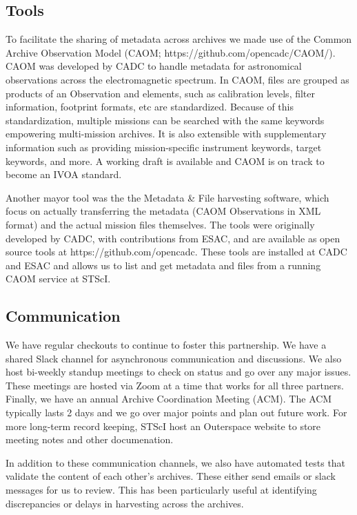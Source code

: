 \documentclass[11pt,twoside]{article}
\begin{document}
\subsection{Tools}

To facilitate the sharing of metadata across archives we made use of the Common Archive Observation Model (CAOM; https://github.com/opencadc/CAOM/). 
CAOM was developed by CADC to handle metadata for astronomical observations across the electromagnetic spectrum. 
In CAOM, files are grouped as products of an Observation and elements, such as calibration levels, filter information, footprint formats, etc are standardized. 
Because of this standardization, multiple missions can be searched with the same keywords empowering multi-mission archives. 
It is also extensible with supplementary information such as providing mission-specific instrument keywords, target keywords, and more. 
A working draft is available and CAOM is on track to become an IVOA standard. 

Another mayor tool was the the Metadata \& File harvesting software, which focus on actually transferring the metadata (CAOM Observations in XML format) and the actual mission files themselves. 
The tools were originally developed by CADC, with contributions from ESAC, and are available as open source tools at https://github.com/opencadc.
These tools are installed at CADC and ESAC and allows us to list and get metadata and files from a running CAOM service at STScI. 

\subsection{Communication}

We have regular checkouts to continue to foster this partnership. 
We have a shared Slack channel for asynchronous communication and discussions. 
We also host bi-weekly standup meetings to check on status and go over any major issues. 
These meetings are hosted via Zoom at a time that works for all three partners. 
Finally, we have an annual Archive Coordination Meeting (ACM). 
The ACM typically lasts 2 days and we go over major points and plan out future work. 
For more long-term record keeping, STScI host an Outerspace website to store meeting notes and other documenation.

In addition to these communication channels, we also have automated tests that validate the content of each other's archives. 
These either send emails or slack messages for us to review.
This has been particularly useful at identifying discrepancies or delays in harvesting across the archives. 
\end{document}
